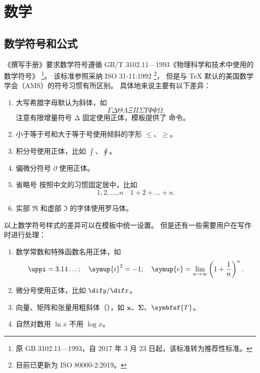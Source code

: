 
\chapter{数学}

\section{数学符号和公式}

《撰写手册》要求数学符号遵循 GB/T 3102.11—1993《物理科学和技术中使用的数学符号》
\footnote{原 GB 3102.11—1993，自 2017 年 3 月 23 日起，该标准转为推荐性标准。}。
该标准参照采纳 ISO 31-11:1992 \footnote{目前已更新为 ISO 80000-2:2019。}，
但是与 \TeX{} 默认的美国数学学会（AMS）的符号习惯有所区别。
具体地来说主要有以下差异：
\begin{enumerate}
  \item 大写希腊字母默认为斜体，如
    \begin{equation*}
      \Gamma \Delta \Theta \Lambda \Xi \Pi \Sigma \Upsilon \Phi \Psi \Omega.
    \end{equation*}
    注意有限增量符号 $\increment$ 固定使用正体，模板提供了  命令。
  \item 小于等于号和大于等于号使用倾斜的字形 $\le$、$\ge$。
  \item 积分号使用正体，比如 $\int$、$\oint$。
  \item
    偏微分符号 $\partial$ 使用正体。
  \item
    省略号  按照中文的习惯固定居中，比如
    \begin{equation*}
      1, 2, \dots, n \quad 1 + 2 + \dots + n.
    \end{equation*}
  \item
    实部 $\Re$ 和虚部 $\Im$ 的字体使用罗马体。
\end{enumerate}

以上数学符号样式的差异可以在模板中统一设置。
但是还有一些需要用户在写作时进行处理：
\begin{enumerate}
  \item 数学常数和特殊函数名用正体，如
    \begin{equation*}
      \uppi = 3.14\dots; \quad
      \symup{i}^2 = -1; \quad
      \symup{e} = \lim_{n \to \infty} \left( 1 + \frac{1}{n} \right)^n.
    \end{equation*}
  \item 微分号使用正体，比如 $\dif y / \dif x$。
  \item 向量、矩阵和张量用粗斜体（），如 $\symbf{x}$、$\symbf{\Sigma}$、$\symbfsf{T}$。
  \item 自然对数用 $\ln x$ 不用 $\log x$。
\end{enumerate}

